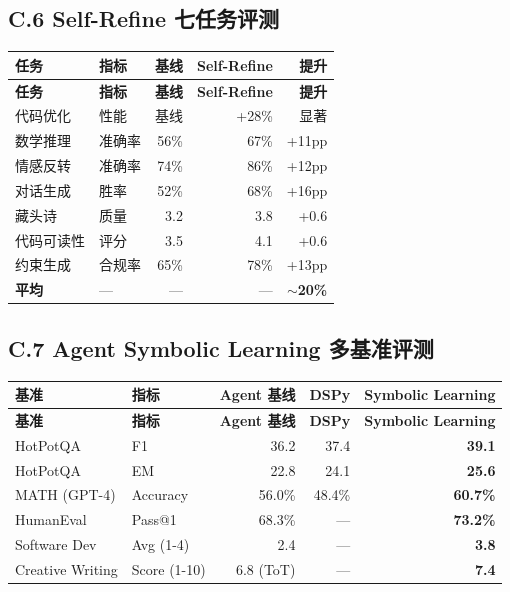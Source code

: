 \subsection*{C.6 Self-Refine 七任务评测}

\begin{longtable}{p{2.5cm}p{2cm}rrr}
\toprule
\textbf{任务} & \textbf{指标} & \textbf{基线} & \textbf{Self-Refine} & \textbf{提升} \\
\midrule
\endfirsthead
\toprule
\textbf{任务} & \textbf{指标} & \textbf{基线} & \textbf{Self-Refine} & \textbf{提升} \\
\midrule
\endhead
\bottomrule
\endlastfoot

代码优化 & 性能 & 基线 & +28\% & 显著 \\
数学推理 & 准确率 & 56\% & 67\% & +11pp \\
情感反转 & 准确率 & 74\% & 86\% & +12pp \\
对话生成 & 胜率 & 52\% & 68\% & +16pp \\
藏头诗 & 质量 & 3.2 & 3.8 & +0.6 \\
代码可读性 & 评分 & 3.5 & 4.1 & +0.6 \\
约束生成 & 合规率 & 65\% & 78\% & +13pp \\
\textbf{平均} & — & — & — & \textbf{$\sim$20\%} \\
\end{longtable}

\subsection*{C.7 Agent Symbolic Learning 多基准评测}

\begin{longtable}{p{2.2cm}p{1.8cm}rrr}
\toprule
\textbf{基准} & \textbf{指标} & \textbf{Agent 基线} & \textbf{DSPy} & \textbf{Symbolic Learning} \\
\midrule
\endfirsthead
\toprule
\textbf{基准} & \textbf{指标} & \textbf{Agent 基线} & \textbf{DSPy} & \textbf{Symbolic Learning} \\
\midrule
\endhead
\bottomrule
\endlastfoot

HotPotQA & F1 & 36.2 & 37.4 & \textbf{39.1} \\
HotPotQA & EM & 22.8 & 24.1 & \textbf{25.6} \\
MATH (GPT-4) & Accuracy & 56.0\% & 48.4\% & \textbf{60.7\%} \\
HumanEval & Pass@1 & 68.3\% & — & \textbf{73.2\%} \\
Software Dev & Avg (1-4) & 2.4 & — & \textbf{3.8} \\
Creative Writing & Score (1-10) & 6.8 (ToT) & — & \textbf{7.4} \\
\end{longtable}


